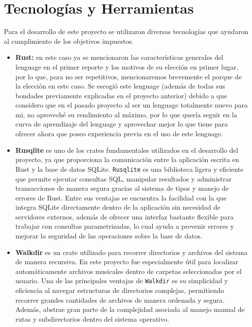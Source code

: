 \documentclass[12pt]{article}
\begin{document}
\section{Tecnologías y Herramientas}

Para el desarrollo de este proyecto se utilizaron diversas tecnologías que ayudaron al cumplimiento de los objetivos impuestos.

\begin{itemize}
\item \textbf{Rust:} en este caso ya se mencionaron las características generales del lenguage en el primer reporte y los motivos de su elección en primer lugar, por lo que, para no ser repetitivos, mencionaremos brevemente el porque de la elección en este caso. Se escogió este lenguage (además de todas sus bondades previamente explicadas en el proyecto anterior) debido a que considero que en el pasado proyecto al ser un lenguage totalmente nuevo para mi, no aproveché su rendimiento al máximo, por lo que quería seguir en la curva de aprendizaje del lenguage y aprovechar mejor lo que tiene para ofrecer ahora que poseo experiencia previa en el uso de este lenguage.

  \item \textbf{Rusqlite} es uno de los crates fundamentales utilizados en el desarrollo del proyecto, ya que proporciona la comunicación entre la aplicación escrita en Rust y la base de datos SQLite. \texttt{Rusqlite} es una biblioteca ligera y eficiente que permite ejecutar consultas SQL, manipular resultados y administrar transacciones de manera segura gracias al sistema de tipos y manejo de errores de Rust. Entre sus ventajas se encuentra la facilidad con la que integra SQLite directamente dentro de la aplicación sin necesidad de servidores externos, además de ofrecer una interfaz bastante flexible para trabajar con consultas parametrizadas, lo cual ayuda a prevenir errores y mejorar la seguridad de las operaciones sobre la base de datos.

\item \textbf{Walkdir} es un crate utilizado para recorrer directorios y archivos del sistema de manera recursiva. En este proyecto fue especialmente útil para localizar automáticamente archivos musicales dentro de carpetas seleccionadas por el usuario. Una de las principales ventajas de \texttt{Walkdir} es su simplicidad y eficiencia al navegar estructuras de directorios complejas, permitiendo recorrer grandes cantidades de archivos de manera ordenada y segura. Además, abstrae gran parte de la complejidad asociada al manejo manual de rutas y subdirectorios dentro del sistema operativo.


\end{itemize}
\end{document}
